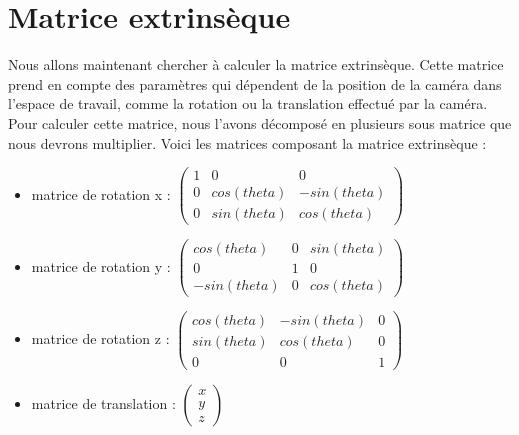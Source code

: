 \documentclass[a4paper,11pt]{article}
\begin{document}

  \section{Matrice extrinsèque}
  
  Nous allons maintenant chercher à calculer la matrice extrinsèque. Cette matrice prend en compte
  des paramètres qui dépendent de la position de la caméra dans l'espace de travail, comme la rotation %
  ou la translation effectué par la caméra. Pour calculer cette matrice, nous l'avons décomposé en 
  plusieurs sous matrice que nous devrons multiplier. Voici les matrices composant la matrice extrinsèque :\\
  
  \begin{itemize}
   \item matrice de rotation x : 
   $\begin{pmatrix}
     1 & 0 & 0\\
     0 & cos(theta) & -sin(theta)\\
     0 & sin(theta) & cos(theta)
    \end{pmatrix}$
    
   \item matrice de rotation y : 
   $\begin{pmatrix}
     cos(theta) & 0 & sin(theta)\\
     0 & 1 & 0\\
     -sin(theta) & 0 & cos(theta)
    \end{pmatrix}$
    
   \item matrice de rotation z : 
   $\begin{pmatrix}
     cos(theta) & -sin(theta) & 0\\
     sin(theta) & cos(theta) & 0\\
     0 & 0 & 1
    \end{pmatrix}$
    
   \item matrice de translation : 
   $\begin{pmatrix}
     x\\
     y\\
     z
    \end{pmatrix}$

  \end{itemize}
  
\end{document}

